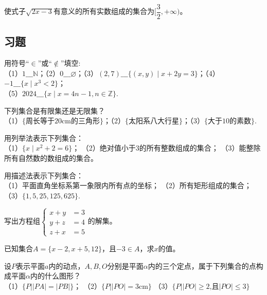 \documentclass[lang=cn,math=cm,chinesefont=nofont,11pt,scheme=chinese,twocol]{elegantbook}
\begin{document}
\begin{example}
  使式子$\sqrt{2x-3}$有意义的所有实数组成的集合为$[\dfrac{3}{2},+\infty)$。
\end{example}

\subsection{习题}

\begin{exercise}\label{exer:1}
  用符号“$\in$”或“$\notin$”填空:\\
（1）$1\_\_\_\mathbb{N}$；（2）$0\_\_\_\varnothing$；（3）$(2,7)\_\_\_\{(x,y)\mid x+2y=3\}$；（4）$-1\_\_\_\{x\mid x^{3}<2\}$；\\（5）$2024\_\_\_\{x\mid x=4n-1,n\in\mathbb{Z}\}$.
\end{exercise}

\begin{exercise}\label{exer:2}
  下列集合是有限集还是无限集？\\
  （1）$\{\text{周长等于20cm的三角形}\}$；（2）$\{\text{太阳系八大行星}\}$；（3）$\{\text{大于10的素数}\}$.
\end{exercise}

\begin{exercise}\label{exer:3}
  用列举法表示下列集合：\\
  （1）$\{x\mid x^2+2=6\}$；
  （2）绝对值小于3的所有整数组成的集合；
  （3）能整除所有自然数的数组成的集合。
\end{exercise}

\begin{exercise}\label{exer:4}
  用描述法表示下列集合：\\
  （1）平面直角坐标系第一象限内所有点的坐标；
  （2）所有矩形组成的集合；
  （3）$\{1,5,25,125,625\}$.
\end{exercise}

\begin{exercise}\label{exer:5}
  写出方程组$\left.\left\{\begin{aligned}x+y&=3\\y+z&=4\\z+x&=5\end{aligned}\right.\right.$的解集。
\end{exercise}

\begin{exercise}\label{exer:6}
  已知集合$A=\{x-2,x+5,12\}$，且$-3\in A$，求$x$的值。
\end{exercise}

\begin{exercise}\label{exer:7}
  设$P$表示平面$a$内的动点，$A,B,O$分别是平面$\alpha$内的三个定点，属于下列集合的点构成平面$\alpha$内的什么图形？\\
  （1）$\{P||PA|=|PB|\}$；
  （2）$\{P||PO|=3\text{cm}\}$
  （3）$\{P||PO|\geqslant2\text{,且}|PO|\leqslant3\}$
\end{exercise}
\end{document}

